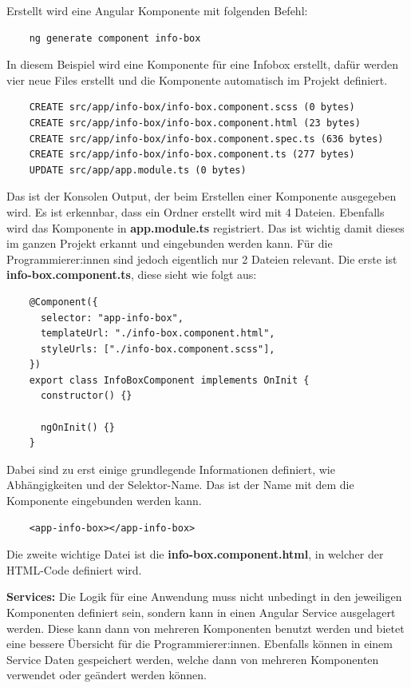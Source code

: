Erstellt wird eine Angular Komponente mit folgenden Befehl:

\begin{lstlisting}
    ng generate component info-box
\end{lstlisting}

In diesem Beispiel wird eine Komponente für eine Infobox erstellt, dafür werden vier neue Files erstellt und die Komponente automatisch im Projekt definiert.

\begin{lstlisting}
    CREATE src/app/info-box/info-box.component.scss (0 bytes)
    CREATE src/app/info-box/info-box.component.html (23 bytes)
    CREATE src/app/info-box/info-box.component.spec.ts (636 bytes)
    CREATE src/app/info-box/info-box.component.ts (277 bytes)
    UPDATE src/app/app.module.ts (0 bytes)
\end{lstlisting}

Das ist der Konsolen Output, der beim Erstellen einer Komponente ausgegeben wird. Es ist erkennbar, dass ein Ordner erstellt wird mit 4 Dateien. Ebenfalls wird das Komponente in \textbf{app.module.ts} registriert. Das ist wichtig damit dieses im ganzen Projekt erkannt und eingebunden werden kann.
Für die Programmierer:innen sind jedoch eigentlich nur 2 Dateien relevant.
Die erste ist \textbf{info-box.component.ts}, diese sieht wie folgt aus:

\begin{lstlisting}
    @Component({
      selector: "app-info-box",
      templateUrl: "./info-box.component.html",
      styleUrls: ["./info-box.component.scss"],
    })
    export class InfoBoxComponent implements OnInit {
      constructor() {}
    
      ngOnInit() {}
    }
\end{lstlisting}

Dabei sind zu erst einige grundlegende Informationen definiert, wie Abhängigkeiten und der Selektor-Name. Das ist der Name mit dem die Komponente eingebunden werden kann.

\begin{lstlisting}
    <app-info-box></app-info-box>
\end{lstlisting}

Die zweite wichtige Datei ist die \textbf{info-box.component.html}, in welcher der HTML-Code definiert wird.

\textbf{Services:}
\newline
Die Logik für eine Anwendung muss nicht unbedingt in den jeweiligen Komponenten definiert sein, sondern kann in einen Angular Service ausgelagert werden. Diese kann dann von mehreren Komponenten benutzt werden und bietet eine bessere Übersicht für die Programmierer:innen.
Ebenfalls können in einem Service Daten gespeichert werden, welche dann von mehreren Komponenten verwendet oder geändert werden können.

